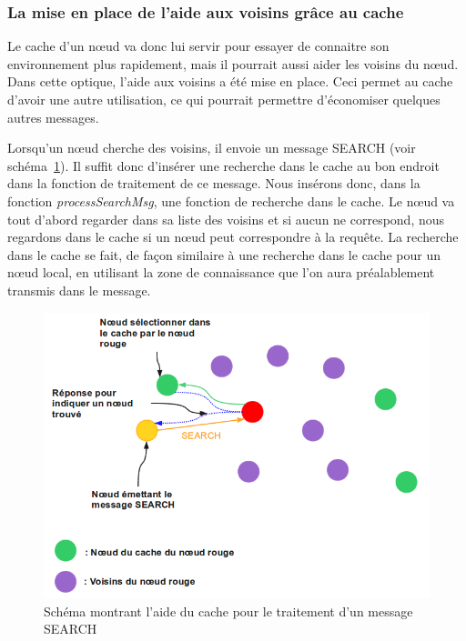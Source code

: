 \subsubsection{La mise en place de l'aide aux voisins grâce au cache}

Le cache d'un nœud va donc lui servir pour essayer de connaitre son environnement plus rapidement, mais il pourrait aussi aider les voisins du nœud. Dans cette optique, l'aide aux voisins a été mise en place. Ceci permet au cache d'avoir une autre utilisation, ce qui pourrait permettre d'économiser quelques autres messages. 
\par Lorsqu'un nœud cherche des voisins, il envoie un message SEARCH (voir schéma~\ref{schemaHelpCache}). Il suffit donc d'insérer une recherche dans le cache au bon endroit dans la fonction de traitement de ce message. Nous insérons donc, dans la fonction \textit{processSearchMsg}, une fonction de recherche dans le cache. Le nœud va tout d'abord regarder dans sa liste des voisins et si aucun ne correspond, nous regardons dans le cache si un nœud peut correspondre à la requête. La recherche dans le cache se fait, de façon similaire à une recherche dans le cache pour un nœud local, en utilisant la zone de connaissance que l'on aura préalablement transmis dans le message.

	\begin{figure}[!h]
        \centering
        \includegraphics[scale=0.4]{./Ressources/Images/cacheHelp.png}
        \caption{Schéma montrant l'aide du cache pour le traitement d'un message SEARCH}
        \label{schemaHelpCache}
        \end{figure}

